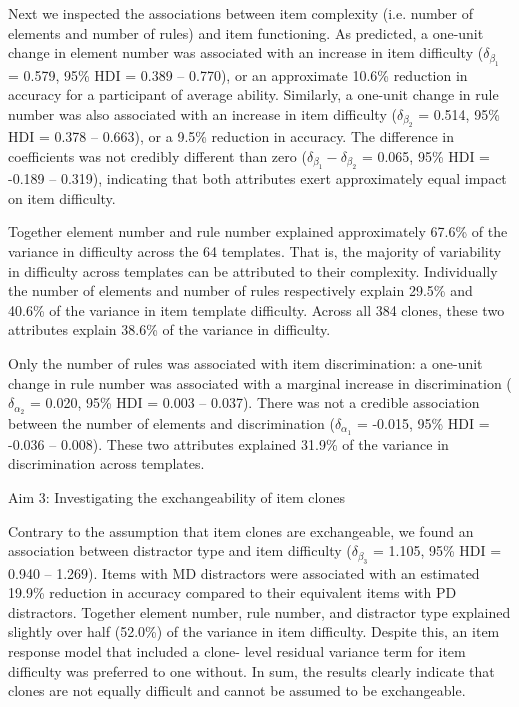 \documentclass[a4paper,man,natbib]{apa6}
\makeatletter
\renewcommand{\subsubsection}{\@startsection{subsubsection}{3}
  {\z@}%
  {\b@level@two@skip}{\e@level@two@skip}%
  {\normalfont\normalsize\bfseries}}
\makeatother
\begin{document}
Next we inspected the associations between item complexity (i.e. number of elements and number of rules) and item functioning. As predicted, a one-unit change in element number was associated with an increase in item difficulty ($\delta_{\beta_1}$ = 0.579, 95\% HDI = 0.389 -- 0.770), or an approximate 10.6\% reduction in accuracy for a participant of average ability. Similarly, a one-unit change in rule number was also associated with an increase in item difficulty ($\delta_{\beta_2}$ = 0.514, 95\% HDI = 0.378 -- 0.663), or a 9.5\% reduction in accuracy. The difference in coefficients was not credibly different than zero ($\delta_{\beta_1} - \delta_{\beta_2}$ = 0.065, 95\% HDI = -0.189 -- 0.319), indicating that both attributes exert approximately equal impact on item difficulty.

Together element number and rule number explained approximately 67.6\% of the variance in difficulty across the 64 templates. That is, the majority of variability in difficulty across templates can be attributed to their complexity. Individually the number of elements and number of rules respectively explain 29.5\% and 40.6\% of the variance in item template difficulty. Across all 384 clones, these two attributes explain 38.6\% of the variance in difficulty.

Only the number of rules was associated with item discrimination: a one-unit change in rule number was associated with a marginal increase in discrimination ($\delta_{\alpha_2}$ = 0.020, 95\% HDI = 0.003 -- 0.037). There was not a credible association between the number of elements and discrimination ($\delta_{\alpha_1}$ = -0.015, 95\% HDI = -0.036 -- 0.008). These two attributes explained 31.9\% of the variance in discrimination across templates. 

\subsubsection{Aim 3: Investigating the exchangeability of item clones}

Contrary to the assumption that item clones are exchangeable, we found an association between distractor type and item difficulty ($\delta_{\beta_3}$ = 1.105, 95\% HDI = 0.940 -- 1.269). Items with MD distractors were associated with an estimated 19.9\% reduction in accuracy compared to their equivalent items with PD distractors. Together element number, rule number, and distractor type explained slightly over half (52.0\%) of the variance in item difficulty. Despite this, an item response model that included a clone- level residual variance term for item difficulty was preferred to one without. In sum, the results clearly indicate that clones are not equally difficult and cannot be assumed to be exchangeable. 
\end{document}
